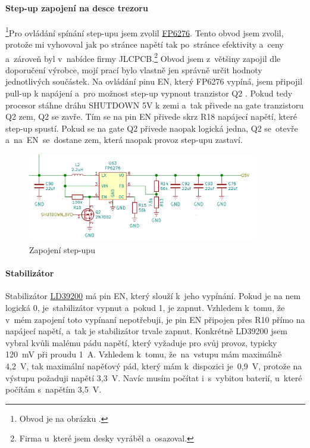 \vspace{-5mm}

\paragraph*{Step-up zapojení na desce trezoru}\footnote{Obvod je na obrázku .}Pro ovládání spínání step-upu jsem zvolil \href{https://datasheet.lcsc.com/szlcsc/Feeling-Tech-FP6276AXR-G1_C83308.pdf}{FP6276}.
Tento obvod jsem zvolil, protože mi vyhovoval jak po stránce napětí tak po~stránce efektivity a~ceny a~zároveň byl v~nabídce firmy JLCPCB.\footnote{Firma u~které jsem desky vyráběl a~osazoval.}
Obvod jsem z~většiny zapojil dle doporučení výrobce, mojí prací bylo vlastně jen správně určit hodnoty 
jednotlivých součástek. Na ovládání pinu EN, který FP6276 vypíná, jsem připojil pull-up k napájení a~pro možnost step-up vypnout tranzistor Q2 \parencite{cj3134k}. 
Pokud tedy procesor stáhne dráhu SHUTDOWN 5V k zemi a~tak přivede na gate tranzistoru Q2 zem, 
Q2 se zavře. Tím se na pin EN přivede skrz R18 napájecí napětí, které step-up spustí. 
Pokud se na gate Q2 přivede naopak logická jedna, Q2 se~otevře a~na~EN~se~dostane zem, která naopak provoz step-upu zastaví.
\vspace{-5mm}
\begin{figure}[h]
    \centering
    \includegraphics[width=0.9\textwidth]{kapitoly/obrazky/E4/napajeni/step-up.png}
    \caption{Zapojení step-upu}
    \label{fig:E4-step-up}
\end{figure}

\paragraph*{Stabilizátor}

Stabilizátor \href{https://datasheet.lcsc.com/szlcsc/1808280153_STMicroelectronics-LD39200PU33R_C222192.pdf}{LD39200} \parencite{ld39200} má pin EN, který slouží k~je\-ho vypínání. 
Pokud je na nem logická 0, je~stabilizátor vypnut a~pokud 1, je zapnut. Vzhledem k~tomu, že v~mém zapojení toto vypínaní nepotřebuji, je pin EN připojen 
přes R10 přímo na napájecí napětí, a~tak je stabilizátor trvale zapnut.
Konkrétně LD39200 jsem vybral kvůli malému pádu napětí, který vyžaduje pro svůj provoz, typicky 120~mV při proudu 1~A. Vzhledem k~tomu, že~na~vstupu 
mám maximálně 4,2~V, tak maximální napěťový pád, který mám k~dispozici je~0,9~V, protože na výstupu požaduji napětí 3,3~V. Navíc musím počítat 
i~s~vybitou baterií, u~které počítám s~napětím 3,5~V. %


